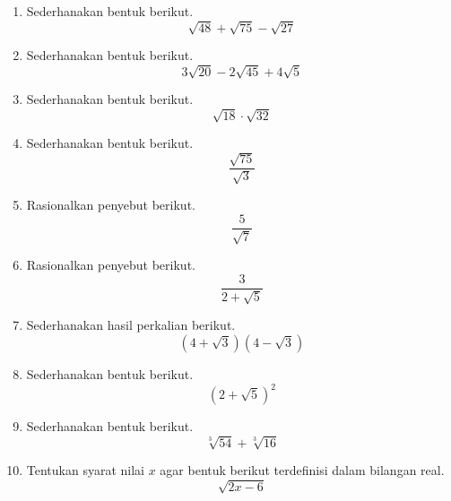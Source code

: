 \documentclass[12pt,a4paper]{article}
\begin{document}
	\begin{enumerate}[label=\arabic*., start=11]
		
		\item Sederhanakan bentuk berikut.
		\[
		\sqrt{48}+\sqrt{75}-\sqrt{27}
		\]
		
		\item Sederhanakan bentuk berikut.
		\[
		3\sqrt{20}-2\sqrt{45}+4\sqrt{5}
		\]
		
		\item Sederhanakan bentuk berikut.
		\[
		\sqrt{18}\cdot\sqrt{32}
		\]
		
		\item Sederhanakan bentuk berikut.
		\[
		\frac{\sqrt{75}}{\sqrt{3}}
		\]
		
		\item Rasionalkan penyebut berikut.
		\[
		\frac{5}{\sqrt{7}}
		\]
		
		\item Rasionalkan penyebut berikut.
		\[
		\frac{3}{2+\sqrt{5}}
		\]
		
		\item Sederhanakan hasil perkalian berikut.
		\[
		(4+\sqrt{3})(4-\sqrt{3})
		\]
		
		\item Sederhanakan bentuk berikut.
		\[
		(2+\sqrt{5})^2
		\]
		
		\item Sederhanakan bentuk berikut.
		\[
		\sqrt[3]{54}+\sqrt[3]{16}
		\]
		
		\item Tentukan syarat nilai \(x\) agar bentuk berikut terdefinisi dalam bilangan real.
		\[
		\sqrt{2x-6}
		\]
		
	\end{enumerate}
	
\end{document}
